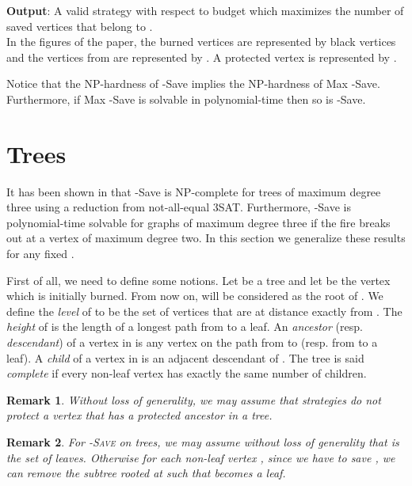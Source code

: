 \documentclass[10pt]{article}
\newtheorem{remark}{Remark}
\begin{document}
\noindent\textbf{Output}: A valid strategy   with respect to budget  which maximizes the number of saved vertices that belong to .\\


In the figures of the paper, the burned vertices are represented by  black vertices and the vertices from  are represented by . A protected vertex is represented by .

\medskip

Notice that the NP-hardness of {\sc -Save} implies the NP-hardness of {\sc Max -Save}. Furthermore, if {\sc Max -Save} is solvable in polynomial-time then so is {\sc -Save}.





\section{Trees} \label{s:trees}


It has been shown in \cite{finbow2007} that {\sc -Save} is NP-complete for trees of maximum degree three using a reduction from not-all-equal 3SAT. Furthermore, {\sc -Save} is polynomial-time solvable for graphs of maximum degree three if the fire breaks out at a vertex of maximum degree two. In this section we generalize these results for any fixed .

First of all, we need to define some notions. Let  be a tree and let  be the vertex which is initially burned. From now on,  will be considered as the root of . We define the \textit{level}  of  to be the set of vertices that are at distance exactly  from . The \textit{height} of  is the length of a longest path from  to a leaf. An \textit{ancestor} (resp. \textit{descendant}) of a vertex  in  is any vertex on the path from  to  (resp. from  to a leaf). A \textit{child} of a vertex  in  is an adjacent descendant of . The tree  is said \textit{complete} if every non-leaf vertex has exactly the same number of children.

\begin{remark}
\label{rem:relstrat}
Without loss of generality, we may assume that strategies do not protect a vertex that has a protected ancestor in a tree.
\end{remark}

\begin{remark}
\label{rem:sleave}
For \textsc{-Save} on trees, we may assume without loss of generality that  is the set of leaves. Otherwise for each non-leaf vertex , since we have to save , we can remove the subtree rooted at  such that  becomes a leaf.
\end{remark}
\end{document}
